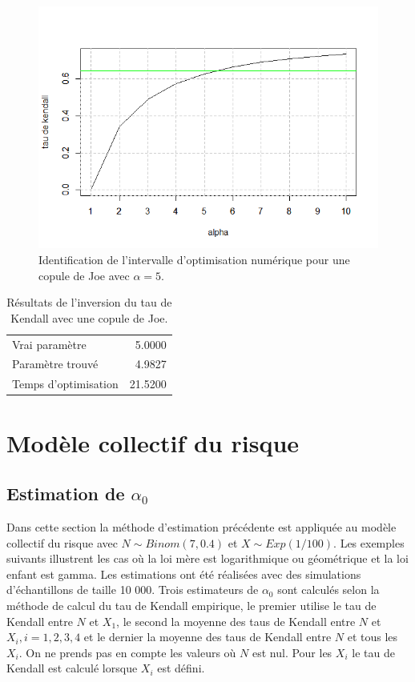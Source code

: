 \documentclass{article}
\begin{document}
	\begin{figure}[H]
		\centering
		\includegraphics[height=8cm]{Graph/intevalle_Joe.png}
		\caption[Identification de l'intervalle d'optimisation numérique pour le scénario \ref{scenario_Joe}]
		{Identification de l'intervalle d'optimisation numérique pour une copule de Joe avec $\alpha = 5$.} 
		\label{graph_intervalle_Joe}
	\end{figure}
	
	\begin{table}[H]
		\centering
		\begin{tabular}{lr}
			\hline
			Vrai paramètre & 5.0000 \\ 
			Paramètre trouvé & 4.9827 \\ 
			Temps d'optimisation & 21.5200 \\ 
			\hline 
		\end{tabular}
		\caption{Résultats de l'inversion du tau de Kendall avec une copule de Joe.}
		\label{tbl_Resultats_Joe}
	\end{table}

	
	\section{Modèle collectif du risque}
	\subsection{Estimation de $\alpha_{0}$}
	
	Dans cette section la méthode d'estimation précédente est appliquée au modèle collectif du risque avec $N \sim Binom(7,0.4) $ et $X \sim Exp(1/100)$. Les exemples suivants illustrent les cas où la loi mère est logarithmique ou géométrique et la loi enfant est gamma. Les estimations ont été réalisées avec des simulations d'échantillons de taille 10 000. Trois estimateurs de $\alpha_{0}$ sont calculés selon la méthode de calcul du tau de Kendall empirique, le premier utilise le tau de Kendall entre $N$ et $X_{1}$, le second la moyenne des taus de Kendall entre $N$ et $X_{i},i=1,2,3,4$ et le dernier la moyenne des taus de Kendall entre $N$ et tous les $X_{i}$. On ne prends pas en compte les valeurs où $N$ est nul. Pour les $X_{i}$ le tau de Kendall est calculé lorsque $X_{i}$ est défini.
	
\end{document}

